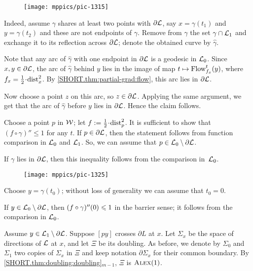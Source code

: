 \begin{wrapfigure}{r}{45mm}
\vskip-2mm
\centering
\texttt{[image: mppics/pic-1315]}
\end{wrapfigure}

Indeed, assume $\gamma$ shares at least two points with $\partial \mathcal{L}$, say $x=\gamma(t_1)$ and $y=\gamma(t_2)$ and these are not endpoints of $\gamma$.
Remove from $\gamma$ the set $\gamma\cap \mathcal{L}_1$
and exchange it to its reflection across $\partial\mathcal{L}$;
denote the obtained curve by $\hat\gamma$.

Note that any arc of $\hat\gamma$ with one endpoint in $\partial \mathcal{L}$
is a geodesic in $\mathcal{L}_0$.
Since $x,y\in \partial \mathcal{L}$, the arc of $\hat\gamma$ behind $y$ lies in the image of map $t\mapsto \mathop{\rm Flow}\nolimits^t_{f_x}(y)$, where $f_x=\tfrac12\cdot\distfun^2_x$.
By \ref{SHORT.thm:partial-grad:flow}, this arc lies in $\partial\mathcal{L}$.

Now choose a point $z$ on this arc, so $z\in \partial\mathcal{L}$.
Applying the same argument, we get that the arc of $\hat\gamma$ before $y$ lies in $\partial\mathcal{L}$.
Hence the claim follows.\claimqeds

Choose a point $p$ in $\mathcal{W}$;
let $f\df\tfrac12\cdot\distfun_p^2$.
It is sufficient to show that $(f\circ\gamma)''\le 1$ for any $t$.
If $p\in \partial\mathcal{L}$, then the statement follows from function comparison in $\mathcal{L}_0$ and $\mathcal{L}_1$.
So, we can assume that $p\in \mathcal{L}_0\setminus \partial\mathcal{L}$.

If $\gamma$ lies in $\partial \mathcal{L}$, then this inequality follows from the comparison in~$\mathcal{L}_0$.

\begin{wrapfigure}{r}{55mm}
\vskip-2mm
\centering
\texttt{[image: mppics/pic-1325]}
\end{wrapfigure}

Choose $y=\gamma(t_0)$; without loss of generality we can assume that $t_0=0$.

If $y\in \mathcal{L}_0\setminus\partial\mathcal{L}$, then $(f\circ\gamma)''(0)\leqslant 1$ in the barrier sense;
it follows from the comparison in $\mathcal{L}_0$.

Assume $y\in \mathcal{L}_1\setminus\partial\mathcal{L}$.
Suppose $[py]$ crosses $\partial L$ at $x$.
Let $\Sigma_x$ be the space of directions of $\mathcal{L}$ at $x$,
and let $\Xi$ be its doubling.
As before, we denote by $\Sigma_0$ and $\Sigma_1$ two copies of $\Sigma_x$ in  $\Xi$
and keep notation $\partial\Sigma_x$ for their common boundary.
By \ref{SHORT.thm:doubling:doubling}$_{m-1}$, $\Xi$ is $\textsc{Alex}(1)$.

